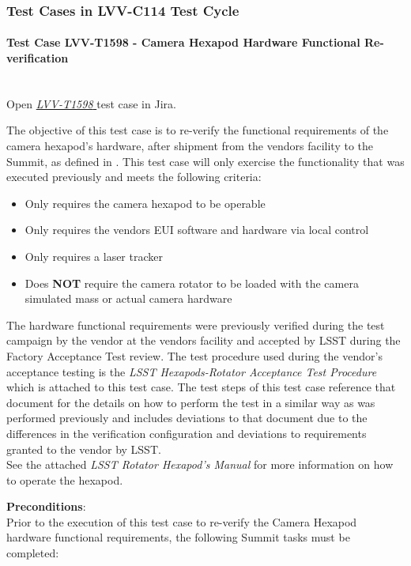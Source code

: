 \documentclass[SE,lsstdraft,STR,toc]{lsstdoc}
\providecommand{\tightlist}{
  \setlength{\itemsep}{0pt}\setlength{\parskip}{0pt}}
\begin{document}
\subsubsection{Test Cases in LVV-C114 Test Cycle}

\paragraph{Test Case LVV-T1598 - Camera Hexapod Hardware Functional Re-verification
 }\mbox{}\\

Open  \href{https://jira.lsstcorp.org/secure/Tests.jspa#/testCase/LVV-T1598}{\textit{ LVV-T1598 } }
test case in Jira.

The objective of this test case is to re-verify the functional
requirements of the camera hexapod's hardware, after shipment from the
vendors facility to the Summit, as defined in . This test case
will only exercise the functionality that was executed previously and
meets the following criteria:

\begin{itemize}
\tightlist
\item
  Only requires the camera hexapod to be operable
\item
  Only requires the vendors EUI software and hardware via local control
\item
  Only requires a laser tracker
\item
  Does \textbf{NOT} require the camera rotator to be loaded with the
  camera simulated mass or actual camera hardware
\end{itemize}

The hardware functional requirements were previously verified during the
test campaign by the vendor at the vendors facility and accepted by LSST
during the Factory Acceptance Test review. The test procedure used
during the vendor's acceptance testing is the \emph{LSST
Hexapods-Rotator Acceptance Test Procedure} which is attached to this
test case. The test steps of this test case reference that document for
the details on how to perform the test in a similar way as was performed
previously and includes deviations to that document due to the
differences in the verification configuration and deviations to
requirements granted to the vendor by LSST.\\[2\baselineskip]See the
attached \emph{LSST Rotator Hexapod's Manual} for more information on
how to operate the hexapod.


\textbf{ Preconditions}:\\
Prior to the execution of this test case to re-verify the Camera Hexapod
hardware functional requirements, the following Summit tasks must be
completed:
\end{document}
